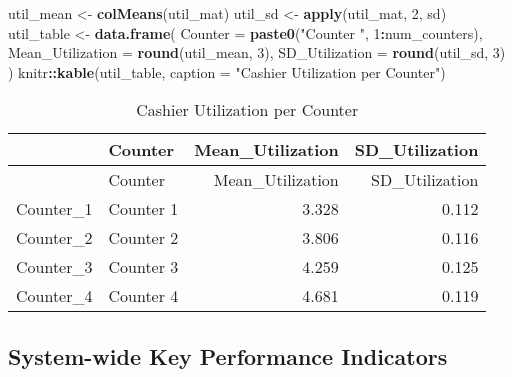 \documentclass[
]{article}
\newenvironment{Shaded}{\begin{snugshade}}{\end{snugshade}}
\newcommand{\AttributeTok}[1]{\textcolor[rgb]{0.13,0.29,0.53}{#1}}
\newcommand{\DecValTok}[1]{\textcolor[rgb]{0.00,0.00,0.81}{#1}}
\newcommand{\FunctionTok}[1]{\textcolor[rgb]{0.13,0.29,0.53}{\textbf{#1}}}
\newcommand{\NormalTok}[1]{#1}
\newcommand{\OtherTok}[1]{\textcolor[rgb]{0.56,0.35,0.01}{#1}}
\newcommand{\SpecialCharTok}[1]{\textcolor[rgb]{0.81,0.36,0.00}{\textbf{#1}}}
\newcommand{\StringTok}[1]{\textcolor[rgb]{0.31,0.60,0.02}{#1}}
\begin{document}
\begin{Shaded}
\begin{Highlighting}[]
\NormalTok{util\_mean }\OtherTok{\textless{}{-}} \FunctionTok{colMeans}\NormalTok{(util\_mat)}
\NormalTok{util\_sd }\OtherTok{\textless{}{-}} \FunctionTok{apply}\NormalTok{(util\_mat, }\DecValTok{2}\NormalTok{, sd)}
\NormalTok{util\_table }\OtherTok{\textless{}{-}} \FunctionTok{data.frame}\NormalTok{(}
\AttributeTok{Counter =} \FunctionTok{paste0}\NormalTok{(}\StringTok{"Counter "}\NormalTok{, }\DecValTok{1}\SpecialCharTok{:}\NormalTok{num\_counters),}
\AttributeTok{Mean\_Utilization =} \FunctionTok{round}\NormalTok{(util\_mean, }\DecValTok{3}\NormalTok{),}
\AttributeTok{SD\_Utilization =} \FunctionTok{round}\NormalTok{(util\_sd, }\DecValTok{3}\NormalTok{)}
\NormalTok{)}
\NormalTok{knitr}\SpecialCharTok{::}\FunctionTok{kable}\NormalTok{(util\_table, }\AttributeTok{caption =} \StringTok{"Cashier Utilization per Counter"}\NormalTok{)}
\end{Highlighting}
\end{Shaded}

\begin{longtable}[]{@{}llrr@{}}
\caption{Cashier Utilization per Counter}\tabularnewline
\toprule\noalign{}
& Counter & Mean\_Utilization & SD\_Utilization \\
\midrule\noalign{}
\endfirsthead
\toprule\noalign{}
& Counter & Mean\_Utilization & SD\_Utilization \\
\midrule\noalign{}
\endhead
\bottomrule\noalign{}
\endlastfoot
Counter\_1 & Counter 1 & 3.328 & 0.112 \\
Counter\_2 & Counter 2 & 3.806 & 0.116 \\
Counter\_3 & Counter 3 & 4.259 & 0.125 \\
Counter\_4 & Counter 4 & 4.681 & 0.119 \\
\end{longtable}

\newpage
\justifying

\subsection{System-wide Key Performance
Indicators}\label{system-wide-key-performance-indicators}
\end{document}
